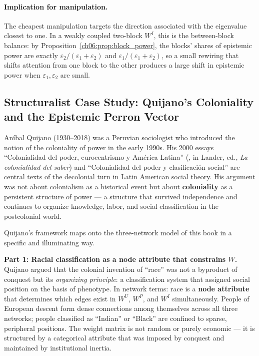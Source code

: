 \documentclass[../structural_economics_book.tex]{subfiles}
\begin{document}
\paragraph{Implication for manipulation.} The cheapest manipulation targets the direction associated with the eigenvalue closest to one. In a weakly coupled two-block $W^I$, this is the between-block balance: by Proposition~\ref{ch06:prop:block_power}, the blocks' shares of epistemic power are exactly $\varepsilon_2/(\varepsilon_1+\varepsilon_2)$ and $\varepsilon_1/(\varepsilon_1+\varepsilon_2)$, so a small rewiring that shifts attention from one block to the other produces a large shift in epistemic power when $\varepsilon_1, \varepsilon_2$ are small.


\subsection*{Structuralist Case Study: Quijano's Coloniality and the Epistemic Perron Vector}

An\'{i}bal Quijano (1930--2018) was a Peruvian sociologist who introduced the notion of the coloniality of power in the early 1990s. His 2000 essays ``Colonialidad del poder, eurocentrismo y Am\'{e}rica Latina'' (\citealt{quijano2000colonialidad}, in Lander, ed., \textit{La colonialidad del saber}) and ``Colonialidad del poder y clasificaci\'{o}n social'' \citep{quijano2000colonialidadclasificacion} are central texts of the decolonial turn in Latin American social theory. His argument was not about colonialism as a historical event but about \textbf{coloniality} as a persistent structure of power --- a structure that survived independence and continues to organize knowledge, labor, and social classification in the postcolonial world.

Quijano's framework maps onto the three-network model of this book in a specific and illuminating way.

\textbf{Part 1: Racial classification as a node attribute that constrains $W$.} Quijano argued that the colonial invention of ``race'' was not a byproduct of conquest but its \textit{organizing principle}: a classification system that assigned social position on the basis of phenotype. In network terms: race is a \textbf{node attribute} that determines which edges exist in $W^U$, $W^P$, and $W^I$ simultaneously. People of European descent form dense connections among themselves across all three networks; people classified as ``Indian'' or ``Black'' are confined to sparse, peripheral positions. The weight matrix is not random or purely economic --- it is structured by a categorical attribute that was imposed by conquest and maintained by institutional inertia.
\end{document}
